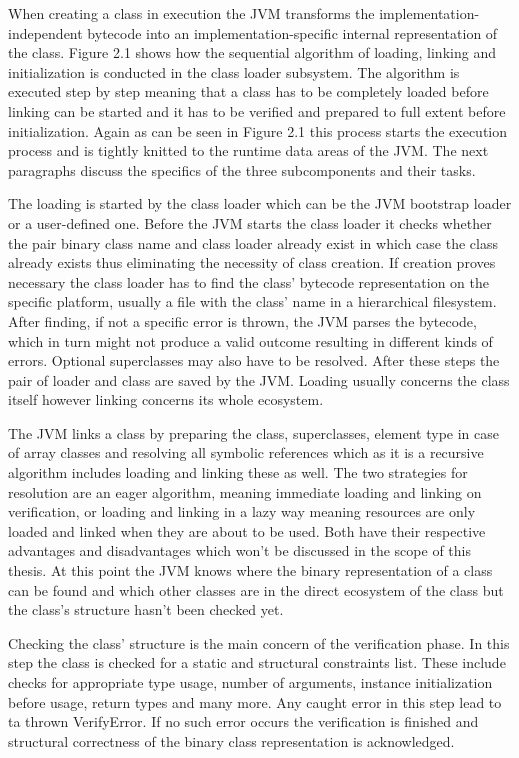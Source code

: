 When creating a class in execution the JVM transforms the implementation-independent bytecode into an implementation-specific internal representation of the class. Figure 2.1 shows how the sequential algorithm of loading, linking and initialization is conducted in the class loader subsystem.
The algorithm is executed step by step meaning that a class has to be completely loaded before linking can be started and it has to be verified and prepared to full extent before initialization. Again as can be seen in Figure 2.1 this process starts the execution process and is tightly knitted to the runtime data areas of the JVM.
The next paragraphs discuss the specifics of the three subcomponents and their tasks.

The loading is started by the class loader which can be the JVM bootstrap loader or a user-defined one. Before the JVM starts the class loader it checks whether the pair binary class name and class loader already exist in which case the class already exists thus eliminating the necessity of class creation. If creation proves necessary the class loader has to find the class' bytecode representation on the specific platform, usually a file with the class' name in a hierarchical filesystem. After finding, if not a specific error is thrown, the JVM parses the bytecode, which in turn might not produce a  valid outcome resulting in different kinds of errors. Optional superclasses may also have to be resolved. After these steps the pair of loader and class are saved by the JVM. Loading usually concerns the class itself however linking concerns its whole ecosystem. \cite{Lindholm}

The JVM links a class by preparing the class, superclasses, element type in case of array classes and resolving all symbolic references which as it is a recursive algorithm includes loading and linking these as well. The two strategies for resolution are an eager algorithm, meaning immediate loading and linking on verification, or loading and linking in a lazy way meaning resources are only loaded and linked when they are about to be used. Both have their respective advantages and disadvantages which won't be discussed in the scope of this thesis. At this point the JVM knows where the binary representation of a class can be found and which other classes are in the direct ecosystem of the class but the class's structure hasn't been checked yet. \cite{Lindholm}

Checking the class' structure is the main concern of the verification phase. In this step the class is checked for a static and structural constraints list. These include checks for appropriate type usage, number of arguments, instance initialization before usage, return types and many more. Any caught error in this step lead to ta thrown VerifyError. If no such error occurs the verification is finished and structural correctness of the binary class representation is acknowledged. \cite{Lindholm}

